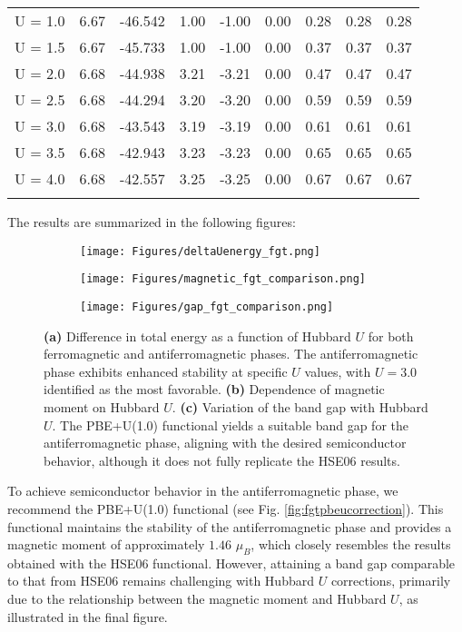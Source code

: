 \begin{table}[H]
\begin{tabular}{cccccc|ccc}
		U = 1.0 & 6.67 & -46.542 & 1.00 & -1.00 & 0.00 & 0.28 & 0.28 & 0.28 \\
		U = 1.5 & 6.67 & -45.733 & 1.00 & -1.00 & 0.00 & 0.37 & 0.37 & 0.37 \\
		U = 2.0 & 6.68 & -44.938 & 3.21 & -3.21 & 0.00 & 0.47 & 0.47 & 0.47 \\
		U = 2.5 & 6.68 & -44.294 & 3.20 & -3.20 & 0.00 & 0.59 & 0.59 & 0.59 \\
		U = 3.0 & 6.68 & -43.543 & 3.19 & -3.19 & 0.00 & 0.61 & 0.61 & 0.61 \\
		U = 3.5 & 6.68 & -42.943 & 3.23 & -3.23 & 0.00 & 0.65 & 0.65 & 0.65 \\
		U = 4.0 & 6.68 & -42.557 & 3.25 & -3.25 & 0.00 & 0.67 & 0.67 & 0.67 \\
		\bottomrule
		\bottomrule
		\label{tab:4.12}
	\end{tabular}
\end{table}

The results are summarized in the following figures:

\begin{figure}[H]
	\centering
	\begin{subfigure}{.50\textwidth}
		\centering
		\texttt{[image: Figures/deltaUenergy\_fgt.png]}
	\end{subfigure}%
	\hfill %
	\begin{subfigure}{.50\textwidth}
		\centering
		\texttt{[image: Figures/magnetic\_fgt\_comparison.png]}
	\end{subfigure}
	\begin{subfigure}{.60\textwidth}
		\centering
		\texttt{[image: Figures/gap\_fgt\_comparison.png]}
	\end{subfigure}
	\caption{\textbf{(a)} Difference in total energy as a function of Hubbard $U$ for both ferromagnetic and antiferromagnetic phases. The antiferromagnetic phase exhibits enhanced stability at specific $U$ values, with $U=3.0$ identified as the most favorable. \textbf{(b)} Dependence of magnetic moment on Hubbard $U$. \textbf{(c)} Variation of the band gap with Hubbard $U$. The PBE+U(1.0) functional yields a suitable band gap for the antiferromagnetic phase, aligning with the desired semiconductor behavior, although it does not fully replicate the HSE06 results.}
	\label{fig:4.18}
\end{figure}

To achieve semiconductor behavior in the antiferromagnetic phase, we recommend the PBE+U(1.0) functional (see Fig. \ref{fig:fgtpbeucorrection}). This functional maintains the stability of the antiferromagnetic phase and provides a magnetic moment of approximately $1.46$ $\mu_{B}$, which closely resembles the results obtained with the HSE06 functional. However, attaining a band gap comparable to that from HSE06 remains challenging with Hubbard $U$ corrections, primarily due to the relationship between the magnetic moment and Hubbard $U$, as illustrated in the final figure.

